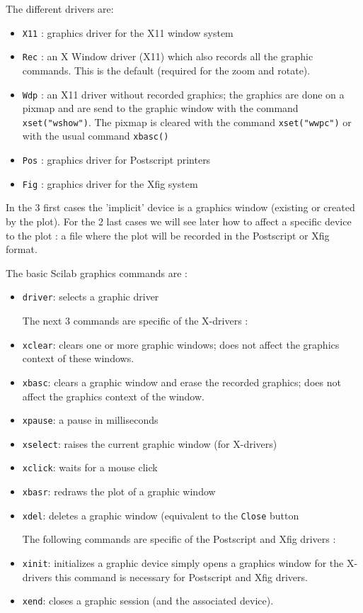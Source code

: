 \noindent The different drivers are:

%
\begin{itemize}
	\item \verb+X11+	: graphics driver for the X11 window system 
	\item \verb+Rec+	: an X Window driver (X11) which also
	records all the graphic commands. This is the default
	(required for the zoom and rotate).
	\item \verb+Wdp+	: an X11 driver without recorded
	graphics; the graphics are done on a pixmap and are send to
	the graphic window with the command  {\tt xset("wshow")}. The 
	pixmap is cleared with the command {\tt xset("wwpc")} or with the
	usual command {\tt xbasc()}
	\item \verb+Pos+	: graphics driver for Postscript printers 
	\item \verb+Fig+	: graphics driver for the Xfig system
\end{itemize}
%

In the 3 first cases the 'implicit' device is a graphics window
(existing or created by the plot). For the 2 last cases we will see
later how to affect a specific device to the plot : a file where the
plot will be recorded in the Postscript or Xfig format.

The basic Scilab graphics commands are :
%
\begin{itemize}
	\item \verb+driver+: selects a graphic driver

The next 3 commands are specific of the X-drivers :

	\item \verb+xclear+: clears one or more graphic windows; does
	not affect the graphics context of these windows.
	\item \verb+xbasc+: clears a graphic window and erase the
	recorded graphics; does not affect the graphics context of  
	the window.
	\item \verb+xpause+: a pause in milliseconds
	\item \verb+xselect+: raises the current graphic window
	(for X-drivers)
	\item \verb+xclick+: waits for a mouse click
	\item \verb+xbasr+: redraws the plot of a graphic window
	\item \verb+xdel+: deletes a graphic window (equivalent to the
	{\tt Close} button

The following commands are specific of the Postscript and Xfig 
drivers :
	
	\item \verb+xinit+: initializes a graphic device
	simply opens a graphics window for the X-drivers this command
	is necessary for Postscript and Xfig drivers.
	\item \verb+xend+: closes a graphic session (and the
	associated device).
\end{itemize}
%

